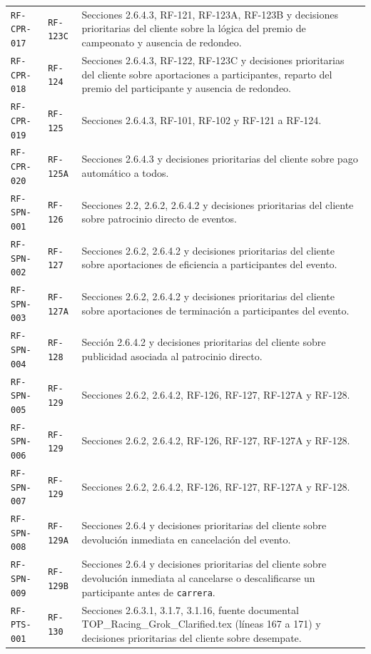 \documentclass[10pt,letterpaper]{article}
\begin{document}
\begin{landscape}
\begin{longtable}{P{2.7cm}P{2.6cm}P{15.7cm}}
\texttt{RF-CPR-017} & \texttt{RF-123C} & Secciones 2.6.4.3, RF-121, RF-123A, RF-123B y decisiones prioritarias del cliente sobre la lógica del premio de campeonato y ausencia de redondeo.\\
\texttt{RF-CPR-018} & \texttt{RF-124} & Secciones 2.6.4.3, RF-122, RF-123C y decisiones prioritarias del cliente sobre aportaciones a participantes, reparto del premio del participante y ausencia de redondeo.\\
\texttt{RF-CPR-019} & \texttt{RF-125} & Secciones 2.6.4.3, RF-101, RF-102 y RF-121 a RF-124.\\
\texttt{RF-CPR-020} & \texttt{RF-125A} & Secciones 2.6.4.3 y decisiones prioritarias del cliente sobre pago automático a todos.\\
\texttt{RF-SPN-001} & \texttt{RF-126} & Secciones 2.2, 2.6.2, 2.6.4.2 y decisiones prioritarias del cliente sobre patrocinio directo de eventos.\\
\texttt{RF-SPN-002} & \texttt{RF-127} & Secciones 2.6.2, 2.6.4.2 y decisiones prioritarias del cliente sobre aportaciones de eficiencia a participantes del evento.\\
\texttt{RF-SPN-003} & \texttt{RF-127A} & Secciones 2.6.2, 2.6.4.2 y decisiones prioritarias del cliente sobre aportaciones de terminación a participantes del evento.\\
\texttt{RF-SPN-004} & \texttt{RF-128} & Sección 2.6.4.2 y decisiones prioritarias del cliente sobre publicidad asociada al patrocinio directo.\\
\texttt{RF-SPN-005} & \texttt{RF-129} & Secciones 2.6.2, 2.6.4.2, RF-126, RF-127, RF-127A y RF-128.\\
\texttt{RF-SPN-006} & \texttt{RF-129} & Secciones 2.6.2, 2.6.4.2, RF-126, RF-127, RF-127A y RF-128.\\
\texttt{RF-SPN-007} & \texttt{RF-129} & Secciones 2.6.2, 2.6.4.2, RF-126, RF-127, RF-127A y RF-128.\\
\texttt{RF-SPN-008} & \texttt{RF-129A} & Secciones 2.6.4 y decisiones prioritarias del cliente sobre devolución inmediata en cancelación del evento.\\
\texttt{RF-SPN-009} & \texttt{RF-129B} & Secciones 2.6.4 y decisiones prioritarias del cliente sobre devolución inmediata al cancelarse o descalificarse un participante antes de \texttt{carrera}.\\
\texttt{RF-PTS-001} & \texttt{RF-130} & Secciones 2.6.3.1, 3.1.7, 3.1.16, fuente documental TOP\_Racing\_Grok\_Clarified.tex (líneas 167 a 171) y decisiones prioritarias del cliente sobre desempate.\\

\end{longtable}
\end{landscape}
\end{document}
